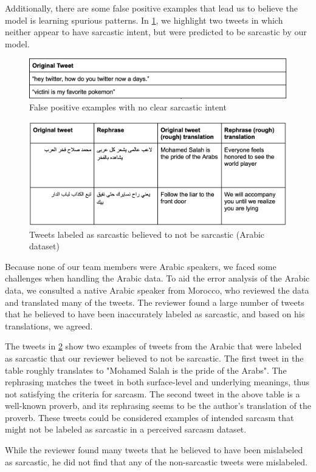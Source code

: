 \documentclass[11pt]{article}
\begin{document}
Additionally, there are some false positive examples that lead us to believe the model is learning spurious patterns. In \ref{table:tweets-false-positive}, we highlight two tweets in which neither appear to have sarcastic intent, but were predicted to be sarcastic by our model.

\begin{figure}[h!]
    \includegraphics[width=.5\textwidth]{Picture12.png}
    \caption{False positive examples with no clear sarcastic intent}
    \label{table:tweets-false-positive}
\end{figure}


\begin{figure}[h!]
    \includegraphics[width=.5\textwidth]{Picture13.png}
    \caption{Tweets labeled as sarcastic believed to not be sarcastic (Arabic dataset)}
    \label{table:tweets-arabic}
\end{figure}


Because none of our team members were Arabic speakers, we faced some challenges when handling the Arabic data. To aid the error analysis of the Arabic data, we consulted a native Arabic speaker from Morocco, who reviewed the data and translated many of the tweets. The reviewer found a large number of tweets that he believed to have been inaccurately labeled as sarcastic, and based on his translations, we agreed. 

The tweets in \ref{table:tweets-arabic} show two examples of tweets from the Arabic that were labeled as sarcastic that our reviewer believed to not be sarcastic. The first tweet in the table roughly translates to "Mohamed Salah is the pride of the Arabs". The rephrasing matches the tweet in both surface-level and underlying meanings, thus not satisfying the criteria for sarcasm. The second tweet in the above table is a well-known proverb, and its rephrasing seems to be the author’s translation of the proverb. These tweets could be considered examples of intended sarcasm that might not be labeled as sarcastic in a perceived sarcasm dataset.

While the reviewer found many tweets that he believed to have been mislabeled as sarcastic, he did not find that any of the non-sarcastic tweets were mislabeled. 
\end{document}
